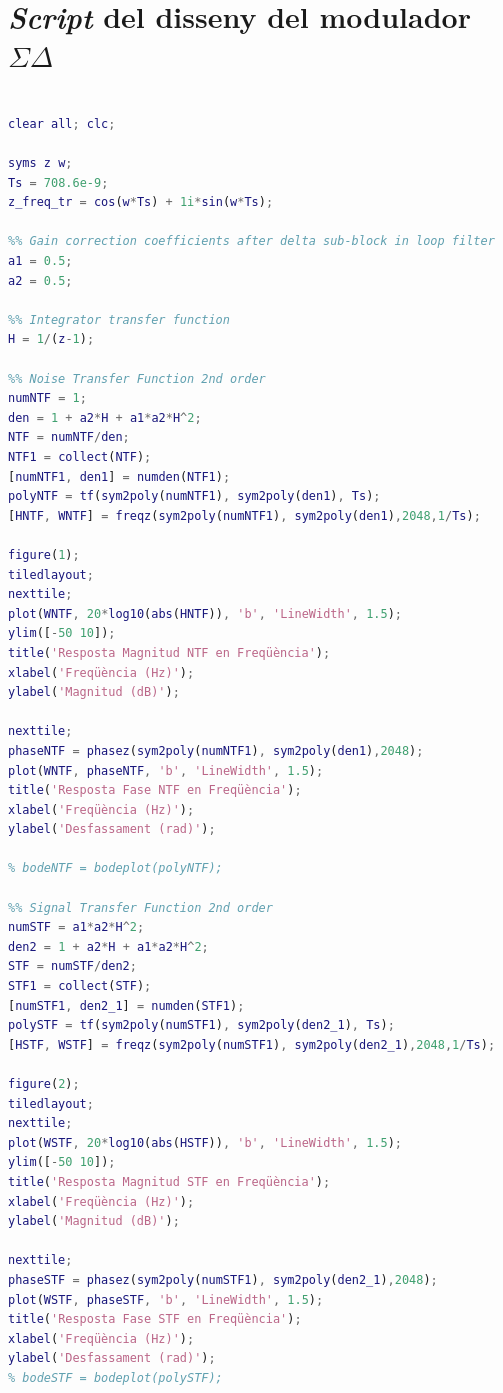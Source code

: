 \section{\textit{Script} del disseny del modulador $\Sigma\Delta$}
\begin{lstlisting}[language=Matlab, basicstyle=\ttfamily\small, breaklines=true, frame=single]

clear all; clc;

syms z w;
Ts = 708.6e-9;
z_freq_tr = cos(w*Ts) + 1i*sin(w*Ts);

%% Gain correction coefficients after delta sub-block in loop filter
a1 = 0.5;
a2 = 0.5;

%% Integrator transfer function
H = 1/(z-1);

%% Noise Transfer Function 2nd order
numNTF = 1;
den = 1 + a2*H + a1*a2*H^2;
NTF = numNTF/den;
NTF1 = collect(NTF);
[numNTF1, den1] = numden(NTF1);
polyNTF = tf(sym2poly(numNTF1), sym2poly(den1), Ts);
[HNTF, WNTF] = freqz(sym2poly(numNTF1), sym2poly(den1),2048,1/Ts);

figure(1);
tiledlayout;
nexttile;
plot(WNTF, 20*log10(abs(HNTF)), 'b', 'LineWidth', 1.5);
ylim([-50 10]);
title('Resposta Magnitud NTF en Freqüència');
xlabel('Freqüència (Hz)');
ylabel('Magnitud (dB)');

nexttile;
phaseNTF = phasez(sym2poly(numNTF1), sym2poly(den1),2048);
plot(WNTF, phaseNTF, 'b', 'LineWidth', 1.5);
title('Resposta Fase NTF en Freqüència');
xlabel('Freqüència (Hz)');
ylabel('Desfassament (rad)');

% bodeNTF = bodeplot(polyNTF);

%% Signal Transfer Function 2nd order
numSTF = a1*a2*H^2;
den2 = 1 + a2*H + a1*a2*H^2;
STF = numSTF/den2;
STF1 = collect(STF);
[numSTF1, den2_1] = numden(STF1);
polySTF = tf(sym2poly(numSTF1), sym2poly(den2_1), Ts);
[HSTF, WSTF] = freqz(sym2poly(numSTF1), sym2poly(den2_1),2048,1/Ts);

figure(2);
tiledlayout;
nexttile;
plot(WSTF, 20*log10(abs(HSTF)), 'b', 'LineWidth', 1.5);
ylim([-50 10]);
title('Resposta Magnitud STF en Freqüència');
xlabel('Freqüència (Hz)');
ylabel('Magnitud (dB)');

nexttile;
phaseSTF = phasez(sym2poly(numSTF1), sym2poly(den2_1),2048);
plot(WSTF, phaseSTF, 'b', 'LineWidth', 1.5);
title('Resposta Fase STF en Freqüència');
xlabel('Freqüència (Hz)');
ylabel('Desfassament (rad)');
% bodeSTF = bodeplot(polySTF);


\end{lstlisting}
